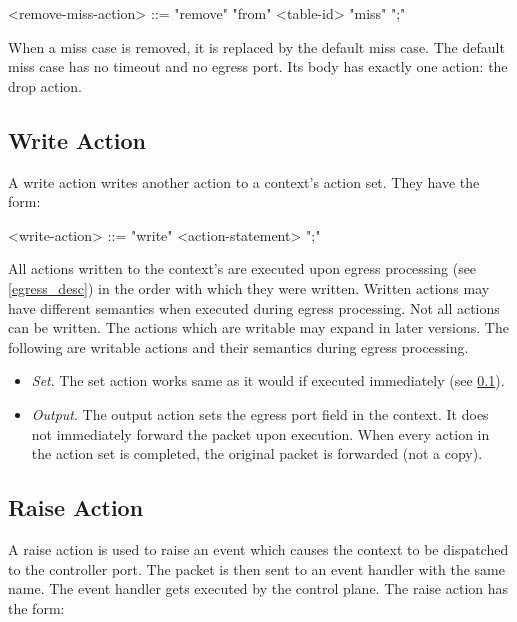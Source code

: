 \begin{minip}
\begin{grammar}
<remove-miss-action> ::= "remove" "from" <table-id> "miss" ";"
\end{grammar}
\end{minip}

When a miss case is removed, it is replaced by the default miss case. The default miss case has no timeout and no egress port. Its body has exactly one action: the drop action.

\subsection{Write Action} \label{guide:write}

A write action writes another action to a context's action set. They have the form:

\begin{minip}
\begin{grammar}
<write-action> ::= "write" <action-statement> ";"
\end{grammar}
\end{minip}

All actions written to the context's are executed upon egress processing (see \ref{egress_desc}) in the order with which they were written. Written actions may have different semantics when executed during egress processing. Not all actions can be written. The actions which are writable may expand in later versions. The following are writable actions and their semantics during egress processing.

\begin{itemize}
\item \textit{Set}. The set action works same as it would if executed immediately (see \ref{guide:write}). 

\item \textit{Output}. The output action sets the egress port field in the context. It does not immediately forward the packet upon execution. When every action in the action set is completed, the original packet is forwarded (not a copy).
\end{itemize}

\subsection{Raise Action} \label{guide:raise}

A raise action is used to raise an event which causes the context to be dispatched to the controller port. The packet is then sent to an event handler with the same name. The event handler gets executed by the control plane. The raise action has the form:

